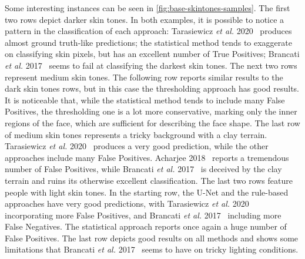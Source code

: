 Some interesting instances can be seen in \autoref{fig:base-skintones-samples}.
The first two rows depict darker skin tones.
In both examples, it is possible to notice a pattern in the classification of each approach: Tarasiewicz \textit{et al.} 2020~\cite{tarasiewicz2020skinny} produces almost ground truth-like predictions; the statistical method tends to exaggerate on classifying skin pixels, but has an excellent number of True Positives; Brancati \textit{et al.} 2017~\cite{brancati2017human} seems to fail at classifying the darkest skin tones.
The next two rows represent medium skin tones.
The following row reports similar results to the dark skin tones rows, but in this case the thresholding approach has good results.
It is noticeable that, while the statistical method tends to include many False Positives, the thresholding one is a lot more conservative, marking only the inner regions of the face, which are sufficient for describing the face shape.
The last row of medium skin tones represents a tricky background with a clay terrain.
Tarasiewicz \textit{et al.} 2020~\cite{tarasiewicz2020skinny} produces a very good prediction, while the other approaches include many False Positives.
Acharjee 2018~\cite{acharjee2018skin} reports a tremendous number of False Positives, while Brancati \textit{et al.} 2017~\cite{brancati2017human} is deceived by the clay terrain and ruins its otherwise excellent classification.
The last two rows feature people with light skin tones.
In the starting row, the U-Net and the rule-based approaches have very good predictions, with Tarasiewicz \textit{et al.} 2020~\cite{tarasiewicz2020skinny} incorporating more False Positives, and Brancati \textit{et al.} 2017~\cite{brancati2017human} including more False Negatives.
The statistical approach reports once again a huge number of False Positives.
The last row depicts good results on all methods and shows some limitations that Brancati \textit{et al.} 2017~\cite{brancati2017human} seems to have on tricky lighting conditions.

